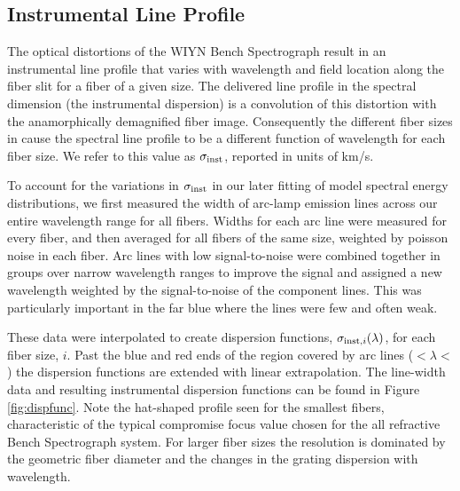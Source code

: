 \subsection{Instrumental Line Profile}
\label{891_1:sec:GPak_dispersion}

The optical distortions of the WIYN Bench Spectrograph result in an
instrumental line profile that varies with wavelength and field
location along the fiber slit for a fiber of a given size. The
delivered line profile in the spectral dimension (the instrumental
dispersion) is a convolution of this distortion with the
anamorphically demagnified fiber image. Consequently the different
fiber sizes in \GP cause the spectral line profile to be a different
function of wavelength for each fiber size. We refer to this value as
$\sigma_{\rm inst}$, reported in units of km/s.

To account for the variations in $\sigma_{\rm inst}$ in our later
fitting of model spectral energy distributions, we first measured the
width of arc-lamp emission lines across our entire wavelength range
for all fibers. Widths for each arc line were measured for every
fiber, and then averaged for all fibers of the same size, weighted by
poisson noise in each fiber. Arc lines with low signal-to-noise were
combined together in groups over narrow wavelength ranges to improve
the signal and assigned a new wavelength weighted by the
signal-to-noise of the component lines. This was particularly
important in the far blue where the lines were few and often
weak.

These data were interpolated to create dispersion functions,
$\sigma_{{\rm inst},i}(\lambda)$, for each fiber size, $i$. Past the
blue and red ends of the region covered by arc lines
($<\lambda <$ ) the dispersion functions
are extended with linear extrapolation. The line-width data and
resulting instrumental dispersion functions can be found in Figure
\ref{fig:dispfunc}. Note the hat-shaped profile seen for the smallest
fibers, characteristic of the typical compromise focus value chosen
for the all refractive Bench Spectrograph system. For larger fiber
sizes the resolution is dominated by the geometric fiber diameter and
the changes in the grating dispersion with wavelength.


